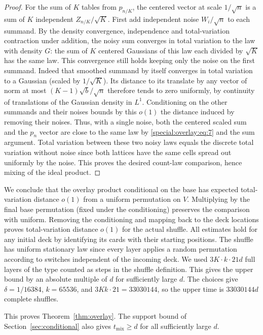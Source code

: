 \begin{proof}
For the sum of \(K\) tables from \(p_{n/K}\), the centered vector at scale \(1/\sqrt n\) is a sum of \(K\) independent \(Z_{n/K}/\sqrt K\). First add independent noise \(W_i/\sqrt n\) to each summand. By the density convergence, independence and total-variation contraction under addition, the noisy sum converges in total variation to the law with density \(G\): the sum of \(K\) centered Gaussians of this law each divided by \(\sqrt K\) has the same law. This convergence still holds keeping only the noise on the first summand. Indeed that smoothed summand by itself converges in total variation to a Gaussian (scaled by \(1/\sqrt K\)). Its distance to its translate by any vector of norm at most \((K-1)\sqrt b/\sqrt n\) therefore tends to zero uniformly, by continuity of translations of the Gaussian density in \(L^1\). Conditioning on the other summands and their noises bounds by this \(o(1)\) the distance induced by removing their noises. Thus, with a single noise, both the centered scaled sum and the \(p_n\) vector are close to the same law by \eqref{special:overlay:eq:7} and the sum argument. Total variation between these two noisy laws equals the discrete total variation without noise since both lattices have the same cells spread out uniformly by the noise. This proves the desired count-law comparison, hence mixing of the ideal product.
\end{proof}

\label{special:overlay:bound}
We conclude that the overlay product conditional on the base has expected total-variation distance \(o(1)\) from a uniform permutation on \(V\). Multiplying by the final base permutation (fixed under the conditioning) preserves the comparison with uniform. Removing the conditioning and mapping back to the deck locations proves total-variation distance \(o(1)\) for the actual shuffle. All estimates hold for any initial deck by identifying its cards with their starting positions. The shuffle has uniform stationary law since every layer applies a random permutation according to switches independent of the incoming deck. We used \(3K\cdot k\cdot 21d\) full layers of the type counted as steps in the shuffle definition. This gives the upper bound by an absolute multiple of \(d\) for sufficiently large \(d\).
The choices give $\delta=1/16384$, $k=65536$, and $3Kk\cdot21=33030144$, so the upper time is $33030144d$ complete shuffles.

This proves Theorem~\ref{thm:overlay}. The support bound of Section~\ref{sec:conditional} also gives $t_{\mathrm{mix}}\ge d$ for all sufficiently large $d$.

